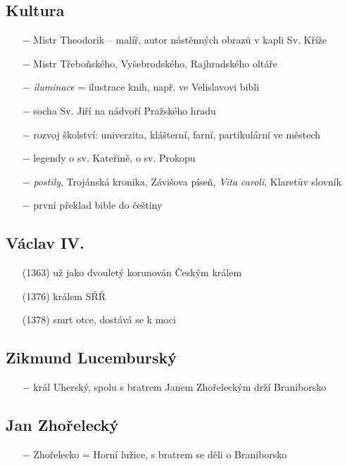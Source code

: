 \documentclass{article}
\begin{document}
\subsection*{Kultura}
\begin{itemize}
    \vspace{-0.5em}
    \setlength\itemsep{0.15em}
    \item[$-$] Mistr Theodorik -- malíř, autor nástěnných obrazů v kapli Sv. Kříže
    \item[$-$] Mistr Třeboňského, Vyšebrodského, Rajhradského oltáře
    \item[$-$] \textit{iluminace} = ilustrace knih, např. ve Velislavovi bibli
    \item[$-$] socha Sv. Jiří na nádvoří Pražského hradu
    \item[$-$] rozvoj školství: univerzita, klášterní, farní, partikulární ve městech
    \item[$-$] legendy o sv. Kateřině, o sv. Prokopu
    \item[$-$] \textit{postily}, Trojánská kronika, Závišova píseň, \textit{Vita caroli}, Klaretův slovník
    \item[$-$] první překlad bible do češtiny
\end{itemize}

\subsection*{Václav IV.}
\begin{itemize}
    \vspace{-0.5em}
    \setlength\itemsep{0.15em}
    \item[(1363)] už jako dvouletý korunován Českým králem
    \item[(1376)] králem SŘŘ
    \item[(1378)] smrt otce, dostává se k moci
\end{itemize}


\subsection*{Zikmund Lucemburský}
\begin{itemize}
    \vspace{-0.5em}
    \setlength\itemsep{0.15em}
    \item[$-$] král Uherský, spolu s bratrem Janem Zhořeleckým drží Braniborsko
\end{itemize}

\subsection*{Jan Zhořelecký}
\begin{itemize}
    \vspace{-0.5em}
    \setlength\itemsep{0.15em}
    \item[$-$] Zhořelecko = Horní lužice, s bratrem se děli o Braniborsko
\end{itemize}
\end{document}
